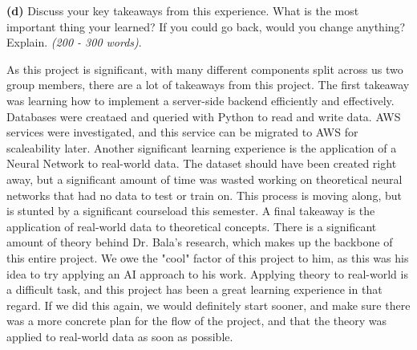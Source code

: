 \documentclass{article}
\begin{document}
\vspace{0.5cm}

\textbf{(d)} Discuss your key takeaways from this experience. What is the most important thing your learned? If you could go back, would you change anything? Explain. \textit{(200 - 300 words)}.

\vspace{0.5cm}

\begin{singlespace}
    \fontsize{10}{12}\selectfont
    As this project is significant, with many different components split across us two group members, there are a lot of takeaways from this project. The first takeaway was learning how to implement a server-side backend efficiently and effectively. Databases were creataed and queried with Python to read and write data. AWS services were investigated, and this service can be migrated to AWS for scaleability later. Another significant learning experience is the application of a Neural Network to real-world data. The dataset should have been created right away, but a significant amount of time was wasted working on theoretical neural networks that had no data to test or train on. This process is moving along, but is stunted by a significant courseload this semester. A final takeaway is the application of real-world data to theoretical concepts. There is a significant amount of theory behind Dr. Bala's research, which makes up the backbone of this entire project. We owe the "cool" factor of this project to him, as this was his idea to try applying an AI approach to his work. Applying theory to real-world is a difficult task, and this project has been a great learning experience in that regard. If we did this again, we would definitely start sooner, and make sure there was a more concrete plan for the flow of the project, and that the theory was applied to real-world data as soon as possible.
\end{singlespace}
\end{document}
